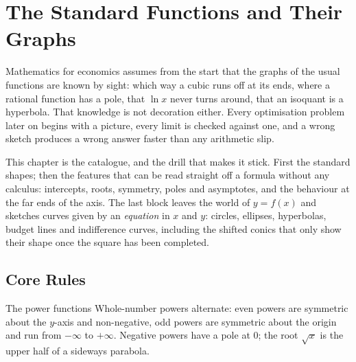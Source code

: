 \chapter{The Standard Functions and Their Graphs}

Mathematics for economics assumes from the start that the graphs of the
usual functions are known by sight: which way a cubic runs off at its ends,
where a rational function has a pole, that $\ln x$ never turns around, that
an isoquant is a hyperbola. That knowledge is not decoration either. Every
optimisation problem later on begins with a picture, every limit is checked
against one, and a wrong sketch produces a wrong answer faster than any
arithmetic slip.

This chapter is the catalogue, and the drill that makes it stick. First the
standard shapes; then the features that can be read straight off a formula
without any calculus: intercepts, roots, symmetry, poles and asymptotes,
and the behaviour at the far ends of the axis. The last block leaves the
world of $y=f(x)$ and sketches curves given by an \emph{equation} in $x$
and $y$: circles, ellipses, hyperbolas, budget lines and indifference
curves, including the shifted conics that only show their shape once the
square has been completed.

\section{Core Rules}

\begin{rulebox}{The power functions}
Whole-number powers alternate: even powers are symmetric about the
$y$-axis and non-negative, odd powers are symmetric about the origin and
run from $-\infty$ to $+\infty$. Negative powers have a pole at $0$; the
root $\sqrt{x}$ is the upper half of a sideways parabola.
\end{rulebox}

\begin{gallery}
\hfill
{}\hfill
{}
\end{gallery}

